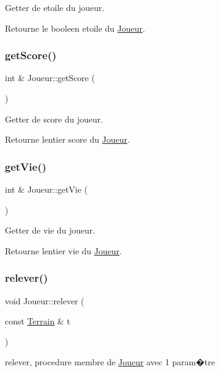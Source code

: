 Getter de etoile du joueur. 

Retourne le booleen etoile du \hyperlink{classJoueur}{Joueur}. \mbox{\label{classJoueur_aa92f778f986e150c708e4cfcbcdc8994}} 
\subsubsection{\texorpdfstring{get\+Score()}{getScore()}}
{\footnotesize\ttfamily int \& Joueur\+::get\+Score (\begin{DoxyParamCaption}{ }\end{DoxyParamCaption})}



Getter de score du joueur. 

Retourne l\textquotesingle{}entier score du \hyperlink{classJoueur}{Joueur}. \mbox{\label{classJoueur_ab272a17d9e5b530e87fc725e4e2009c8}} 
\subsubsection{\texorpdfstring{get\+Vie()}{getVie()}}
{\footnotesize\ttfamily int \& Joueur\+::get\+Vie (\begin{DoxyParamCaption}{ }\end{DoxyParamCaption})}



Getter de vie du joueur. 

Retourne l\textquotesingle{}entier vie du \hyperlink{classJoueur}{Joueur}. \mbox{\label{classJoueur_a2280e97e2f7b686e9fe509b14fbbf261}} 
\subsubsection{\texorpdfstring{relever()}{relever()}}
{\footnotesize\ttfamily void Joueur\+::relever (\begin{DoxyParamCaption}\item[{const \hyperlink{classTerrain}{Terrain} \&}]{t }\end{DoxyParamCaption})}



relever, procedure membre de \hyperlink{classJoueur}{Joueur} avec 1 param�tre 

